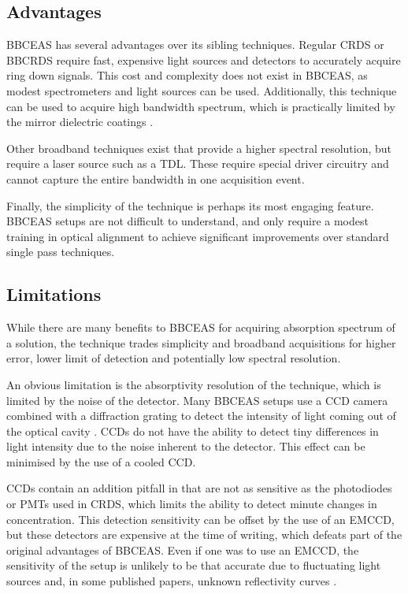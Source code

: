 \subsection{Advantages}\label{subsec:bbceas_adv}

\acl{BBCEAS} has several advantages over its sibling techniques. Regular
\ac{CRDS} or \ac{BBCRDS} require fast, expensive light sources and detectors to
accurately acquire ring down signals. This cost and complexity does not exist
in \ac{BBCEAS}, as modest spectrometers and light sources can be used.
Additionally, this technique can be used to acquire high bandwidth spectrum,
which is practically limited by the mirror dielectric coatings
\cite{Islam:2007ea}.

Other broadband techniques exist that provide a higher spectral resolution, but
require a laser source such as a \acl{TDL}. These require special driver
circuitry and cannot capture the entire bandwidth in one acquisition event.

Finally, the simplicity of the technique is perhaps its most engaging feature.
\ac{BBCEAS} setups are not difficult to understand, and only require a modest
training in optical alignment to achieve significant improvements over standard
single pass techniques.



\subsection{Limitations}\label{subsec:bbceas_limits}

While there are many benefits to \ac{BBCEAS} for acquiring absorption spectrum
of a solution, the technique trades simplicity and broadband acquisitions for
higher error, lower limit of detection and potentially low spectral
resolution.


An obvious limitation is the absorptivity resolution of the technique, which is
limited by the noise of the detector. Many \ac{BBCEAS} setups use a \ac{CCD}
camera combined with a diffraction grating to detect the intensity of light
coming out of the optical cavity \cite{Berden:2009wk}.  \acp{CCD} do not have
the ability to detect tiny differences in light intensity due to the noise
inherent to the detector. This effect can be minimised by the use of a cooled
\ac{CCD}.

\acp{CCD} contain an addition pitfall in that are not as sensitive as the
photodiodes or \acp{PMT} used in \ac{CRDS}, which limits the ability to detect
minute changes in concentration. This detection sensitivity can be offset by
the use of an \ac{EMCCD}, but these detectors are expensive at the time of
writing, which defeats part of the original advantages of \ac{BBCEAS}. Even if
one was to use an \ac{EMCCD}, the sensitivity of the setup is unlikely to be
that accurate due to fluctuating light sources and, in some published papers,
unknown reflectivity curves \cite{Islam:2007ea}.

